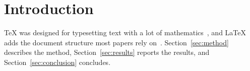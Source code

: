 \section{Introduction}
\label{sec:introduction}

\TeX{} was designed for typesetting text with a lot of mathematics~\cite{knuth1984texbook},
and \LaTeX{} adds the document structure most papers rely on~\cite{lamport1994latex}.
Section~\ref{sec:method} describes the method, Section~\ref{sec:results} reports the
results, and Section~\ref{sec:conclusion} concludes.
